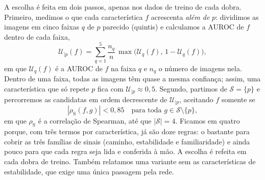 A escolha é feita em dois passos, apenas nos dados de treino de cada dobra. Primeiro, medimos o que
cada característica $f$ acrescenta \emph{além de} $p$: dividimos as imagens em cinco faixas $q$ de $p$ parecido
(quintis) e calculamos a AUROC de $f$ dentro de cada faixa,
\begin{equation}
  \mathcal{U}_{|p}(f) = \sum_{q=1}^{5} \frac{n_q}{n}\,\max\!\big(\mathcal{U}_q(f),\, 1 - \mathcal{U}_q(f)\big),
  \label{eq:auroc_alem}
\end{equation}
em que $\mathcal{U}_q(f)$ é a AUROC de $f$ na faixa $q$ e $n_q$ o número de imagens nela. Dentro de uma faixa, todas
as imagens têm quase a mesma confiança; assim, uma característica que só repete $p$ fica com $\mathcal{U}_{|p} \approx 0{,}5$.
Segundo, partimos de $\mathcal{S} = \{p\}$ e percorremos as candidatas em ordem decrescente de
$\mathcal{U}_{|p}$, aceitando $f$ somente se
\begin{equation}
  |\rho_{\mathrm{S}}(f, g)| < 0{,}85 \quad \text{para toda } g \in \mathcal{S} \setminus \{p\},
  \label{eq:selecao}
\end{equation}
em que $\rho_{\mathrm{S}}$ é a correlação de Spearman, até que $|\mathcal{S}| = 4$. Ficamos em quatro porque,
com três termos por característica, já são doze regras: o bastante para cobrir as três famílias de sinais
(caminho, estabilidade e familiaridade) e ainda pouco para que cada regra seja lida e conferida à mão.
A escolha é refeita em cada dobra de treino. Também relatamos uma variante sem as características de estabilidade,
que exige uma única passagem pela rede.

